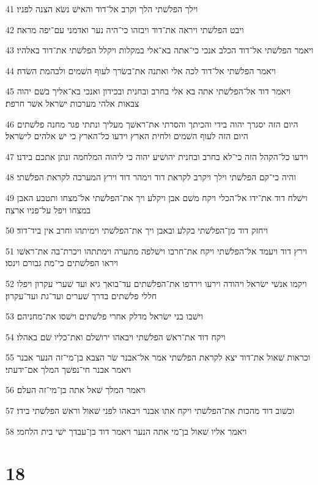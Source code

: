 \par 41 וילך הפלשׁתי הלך וקרב אל־דוד והאישׁ נשׂא הצנה לפניו׃
\par 42 ויבט הפלשׁתי ויראה את־דוד ויבזהו כי־היה נער ואדמני עם־יפה מראה׃
\par 43 ויאמר הפלשׁתי אל־דוד הכלב אנכי כי־אתה בא־אלי במקלות ויקלל הפלשׁתי את־דוד באלהיו׃
\par 44 ויאמר הפלשׁתי אל־דוד לכה אלי ואתנה את־בשׂרך לעוף השׁמים ולבהמת השׂדה׃
\par 45 ויאמר דוד אל־הפלשׁתי אתה בא אלי בחרב ובחנית ובכידון ואנכי בא־אליך בשׁם יהוה צבאות אלהי מערכות ישׂראל אשׁר חרפת׃
\par 46 היום הזה יסגרך יהוה בידי והכיתך והסרתי את־ראשׁך מעליך ונתתי פגר מחנה פלשׁתים היום הזה לעוף השׁמים ולחית הארץ וידעו כל־הארץ כי ישׁ אלהים לישׂראל׃
\par 47 וידעו כל־הקהל הזה כי־לא בחרב ובחנית יהושׁיע יהוה כי ליהוה המלחמה ונתן אתכם בידנו׃
\par 48 והיה כי־קם הפלשׁתי וילך ויקרב לקראת דוד וימהר דוד וירץ המערכה לקראת הפלשׁתי׃
\par 49 וישׁלח דוד את־ידו אל־הכלי ויקח משׁם אבן ויקלע ויך את־הפלשׁתי אל־מצחו ותטבע האבן במצחו ויפל על־פניו ארצה׃
\par 50 ויחזק דוד מן־הפלשׁתי בקלע ובאבן ויך את־הפלשׁתי וימיתהו וחרב אין ביד־דוד׃
\par 51 וירץ דוד ויעמד אל־הפלשׁתי ויקח את־חרבו וישׁלפה מתערה וימתתהו ויכרת־בה את־ראשׁו ויראו הפלשׁתים כי־מת גבורם וינסו׃
\par 52 ויקמו אנשׁי ישׂראל ויהודה וירעו וירדפו את־הפלשׁתים עד־בואך גיא ועד שׁערי עקרון ויפלו חללי פלשׁתים בדרך שׁערים ועד־גת ועד־עקרון׃
\par 53 וישׁבו בני ישׂראל מדלק אחרי פלשׁתים וישׁסו את־מחניהם׃
\par 54 ויקח דוד את־ראשׁ הפלשׁתי ויבאהו ירושׁלם ואת־כליו שׂם באהלו׃
\par 55 וכראות שׁאול את־דוד יצא לקראת הפלשׁתי אמר אל־אבנר שׂר הצבא בן־מי־זה הנער אבנר ויאמר אבנר חי־נפשׁך המלך אם־ידעתי׃
\par 56 ויאמר המלך שׁאל אתה בן־מי־זה העלם׃
\par 57 וכשׁוב דוד מהכות את־הפלשׁתי ויקח אתו אבנר ויבאהו לפני שׁאול וראשׁ הפלשׁתי בידו׃
\par 58 ויאמר אליו שׁאול בן־מי אתה הנער ויאמר דוד בן־עבדך ישׁי בית הלחמי׃

\chapter{18}

